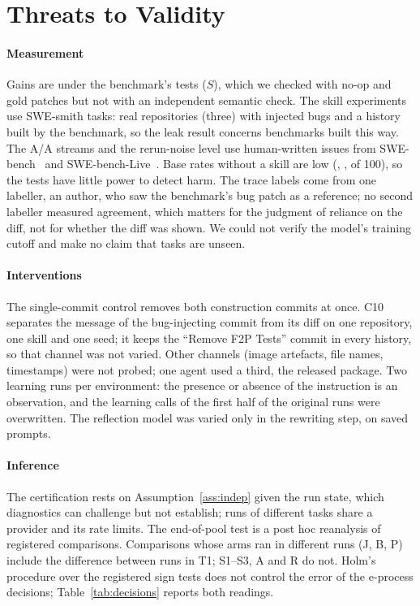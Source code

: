 \documentclass[sigconf,review,anonymous]{acmart}
\begin{document}
\section{Threats to Validity}\label{sec:threats}
\paragraph{Measurement}
Gains are under the benchmark's tests ($S$), which we checked with no-op and gold patches but not
with an independent semantic check. The skill experiments use SWE-smith tasks: real repositories
(three) with injected bugs and a history built by the benchmark, so the leak result concerns
benchmarks built this way. The A/A streams and the rerun-noise level use human-written issues from
SWE-bench~\cite{swebench} and SWE-bench-Live~\cite{swe_bench_live_neurips}. Base rates without a skill
are low (\njinjaNone{}, \nbleveNone{}, \npygNone{} of 100), so the tests have little power to detect
harm. The trace labels come from one labeller, an author, who saw the benchmark's bug patch as
a reference; no second labeller measured agreement, which matters for the judgment of reliance on
the diff, not for whether the diff was shown. We could not verify the model's training
cutoff and make no claim that tasks are unseen.

\paragraph{Interventions}
The single-commit control removes both construction commits at once. C10 separates the message of
the bug-injecting commit from its diff on one repository, one skill and one seed; it keeps the
``Remove F2P Tests'' commit in every history, so that channel was not varied.
Other channels (image artefacts, file names, timestamps) were not probed; one agent used a third,
the released package. Two learning runs per environment: the presence or absence of the instruction
is an observation, and the learning calls of the first half of the original runs were overwritten.
The reflection model was varied only in the rewriting step, on saved prompts.

\paragraph{Inference}
The certification rests on Assumption~\ref{ass:indep} given the run state, which diagnostics can
challenge but not establish; runs of different tasks share a provider and its rate limits. The
end-of-pool test is a post hoc reanalysis of registered comparisons. Comparisons whose arms ran in
different runs (J, B, P) include the difference between runs in T1; S1--S3, A and R do not. Holm's
procedure over the registered sign tests does not control the error of the e-process decisions;
Table~\ref{tab:decisions} reports both readings.
\end{document}
